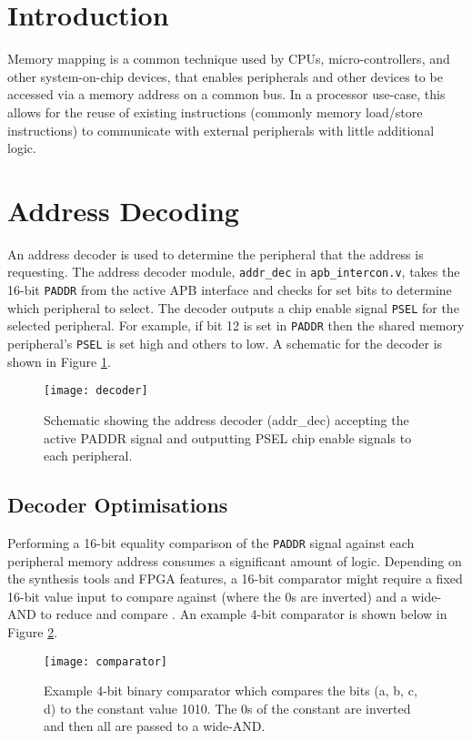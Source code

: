 \section{Introduction}
Memory mapping is a common technique used by CPUs, micro-controllers, and other system-on-chip devices, that enables peripherals and other devices to be accessed via a memory address on a common bus. In a processor use-case, this allows for the reuse of existing instructions (commonly memory load/store instructions) to communicate with external peripherals with little additional logic.

\section{Address Decoding}
An address decoder is used to determine the peripheral that the address is requesting. The address decoder module, \verb|addr_dec| in \verb|apb_intercon.v|, takes the 16-bit \verb|PADDR| from the active APB interface and checks for set bits to determine which peripheral to select. The decoder outputs a chip enable signal \verb|PSEL| for the selected peripheral. For example, if bit 12 is set in \verb|PADDR| then the shared memory peripheral's \verb|PSEL| is set high and others to low. A schematic for the decoder is shown in Figure \ref{fig:decoder}.

\begin{figure}[H]
\centering
\texttt{[image: decoder]}
\caption{Schematic showing the address decoder (addr\_dec) accepting the active PADDR signal and outputting PSEL chip enable signals to each peripheral.}
\label{fig:decoder}
\end{figure}

\subsection{Decoder Optimisations}
Performing a 16-bit equality comparison of the \verb|PADDR| signal against each peripheral memory address consumes a significant amount of logic. Depending on the synthesis tools and FPGA features, a 16-bit comparator might require a fixed 16-bit value input to compare against (where the 0s are inverted) and a wide-AND to reduce and compare \cite{palchaudhuri2015high,salauyou2015designing}. An example 4-bit comparator is shown below in Figure \ref{fig:comparator}.

\begin{figure}[H]
\centering
\texttt{[image: comparator]}
\caption{Example 4-bit binary comparator which compares the bits (a, b, c, d) to the constant value 1010. The 0s of the constant are inverted and then all are passed to a wide-AND.}
\label{fig:comparator}
\end{figure}

